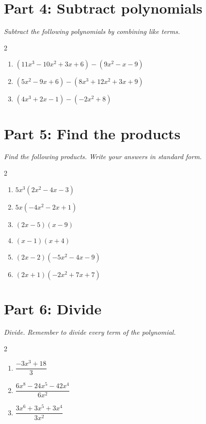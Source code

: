 \documentclass[11pt]{article}
\begin{document}
\section*{Part 4: Subtract polynomials}
\noindent\textit{Subtract the following polynomials by combining like terms.}
\begin{multicols}{2}
\begin{enumerate}
  \item $(11x^{3} - 10x^{2} + 3x + 6) - (9x^{2} - x - 9)$
  \vspace{1.8cm}
  \item $(5x^{2} - 9x + 6) - (8x^{3} + 12x^{2} + 3x + 9)$
  \vspace{1.8cm}
  \item $(4x^{3} + 2x - 1) - (-2x^{2} + 8)$
  \vspace{1.8cm}
\end{enumerate}
\end{multicols}

\section*{Part 5: Find the products}
\noindent\textit{Find the following products. Write your answers in standard form.}
\begin{multicols}{2}
\begin{enumerate}
  \item $5x^{3}(2x^{2} - 4x - 3)$
  \vspace{1.8cm}
  \item $5x(-4x^{2} - 2x + 1)$
  \vspace{1.8cm}
  \item $(2x - 5)(x - 9)$
  \vspace{1.8cm}
  \item $(x - 1)(x + 4)$
  \vspace{1.8cm}
  \item $(2x - 2)(-5x^{2} - 4x - 9)$
  \vspace{1.8cm}
  \item $(2x + 1)(-2x^{2} + 7x + 7)$
  \vspace{1.8cm}
\end{enumerate}
\end{multicols}

\section*{Part 6: Divide}
\noindent\textit{Divide. Remember to divide every term of the polynomial.}
\begin{multicols}{2}
\begin{enumerate}
  \item $\dfrac{-3x^{3} + 18}{3}$
  \vspace{1.6cm}
  \item $\dfrac{6x^{8} - 24x^{5} - 42x^{4}}{6x^{2}}$
  \vspace{1.6cm}
  \item $\dfrac{3x^{6} + 3x^{5} + 3x^{4}}{3x^{2}}$
  \vspace{1.6cm}
\end{enumerate}
\end{multicols}
\end{document}

